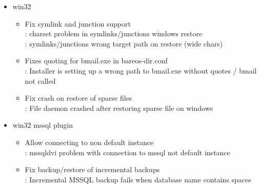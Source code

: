 {\begin{itemize}
    \item win32
    \begin{itemize}
        \item Fix symlink and junction support\\
            : charset problem in symlinks/junctions windows restore \\
            : symlinks/junctions wrong target path on restore (wide chars)
        \item Fixes quoting for bmail.exe in bareos-dir.conf \\
            : Installer is setting up a wrong path to bmail.exe without quotes / bmail not called
        \item Fix crash on restore of sparse files \\
            : File daemon crashed after restoring sparse file on windows
    \end{itemize}
    \item win32 mssql plugin
    \begin{itemize}
        \item Allow connecting to non default instance \\
            : mssqldvi problem with connection to mssql not default instance
        \item Fix backup/restore of incremental backups \\
            : Incremental MSSQL backup fails when database name contains spaces
    \end{itemize}
\end{itemize}
}




